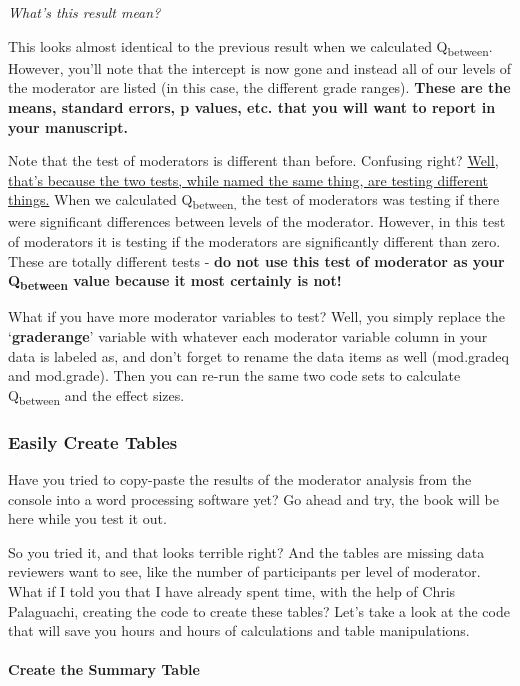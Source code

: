 \documentclass[
]{book}
\begin{document}
\emph{What's this result mean?}

This looks almost identical to the previous result when we calculated Q\textsubscript{between}. However, you'll note that the intercept is now gone and instead all of our levels of the moderator are listed (in this case, the different grade ranges). \textbf{These are the means, standard errors, p values, etc. that you will want to report in your manuscript.}

Note that the test of moderators is different than before. Confusing right? \ul{Well, that's because the two tests, while named the same thing, are testing different things.} When we calculated Q\textsubscript{between,} the test of moderators was testing if there were significant differences between levels of the moderator. However, in this test of moderators it is testing if the moderators are significantly different than zero. These are totally different tests - \textbf{do not use this test of moderator as your Q\textsubscript{between} value because it most certainly is not!}

What if you have more moderator variables to test? Well, you simply replace the `\textbf{graderange}' variable with whatever each moderator variable column in your data is labeled as, and don't forget to rename the data items as well (mod.gradeq and mod.grade). Then you can re-run the same two code sets to calculate Q\textsubscript{between} and the effect sizes.

\hypertarget{easily-create-tables}{%
\subsubsection{Easily Create Tables}\label{easily-create-tables}}

Have you tried to copy-paste the results of the moderator analysis from the console into a word processing software yet? Go ahead and try, the book will be here while you test it out.

So you tried it, and that looks terrible right? And the tables are missing data reviewers want to see, like the number of participants per level of moderator. What if I told you that I have already spent time, with the help of Chris Palaguachi, creating the code to create these tables? Let's take a look at the code that will save you hours and hours of calculations and table manipulations.

\hypertarget{create-the-summary-table}{%
\paragraph{Create the Summary Table}\label{create-the-summary-table}}
\end{document}
